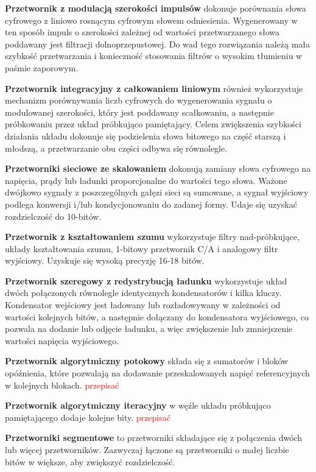 \documentclass[10pt,a4paper,twoside]{report}
\theoremstyle{definition}
\theoremstyle{definition}
\theoremstyle{definition}
\theoremstyle{definition}
\theoremstyle{definition}
\begin{document}
	{	\textbf{Przetwornik z modulacją szerokości impulsów} dokonuje porównania słowa cyfrowego z liniowo rosnącym cyfrowym słowem odniesienia. Wygenerowany w ten sposób impuls o szerokości zależnej od wartości przetwarzanego słowa poddawany jest filtracji dolnoprzepustowej. Do wad tego rozwiązania należą mała szybkość przetwarzania i konieczność stosowania filtrów o wysokim tłumieniu w paśmie zaporowym. }
	
	{	\textbf{Przetwornik integracyjny z całkowaniem liniowym} również wykorzystuje mechanizm porównywania liczb cyfrowych do wygenerowania sygnału o modulowanej szerokości, który jest poddawany scałkowaniu, a następnie próbkowaniu przez układ próbkująco pamiętający. Celem zwiększenia szybkości działania układu dokonuje się podzielenia słowa bitowego na część starszą i młodszą, a przetwarzanie obu części odbywa się równolegle. }
	
	{	\textbf{Przetworniki sieciowe ze skalowaniem} dokonują zamiany słowa cyfrowego na napięcia, prądy lub ładunki proporcjonalne do wartości tego słowa. Ważone dwójkowo sygnały z poszczególnych gałęzi sieci są sumowane, a sygnał wyjściowy podlega konwersji i/lub kondycjonowaniu do zadanej formy. Udaje się uzyskać rozdzielczość do 10-bitów.}
	
	{	\textbf{Przetwornik z kształtowaniem szumu} wykorzystuje filtry nad-próbkujące, układy kształtowania szumu, 1-bitowy przetwornik C/A i analogowy filtr wyjściowy. Uzyskuje się wysoką precyzję 16-18 bitów. }
	
	{	\textbf{Przetwornik szeregowy z redystrybucją ładunku} wykorzystuje układ dwóch połączonych równolegle identycznych kondensatorów i kilka kluczy. Kondensator wejściowy jest ładowany lub rozładowywany w zależności od wartości kolejnych bitów, a następnie dołączany do kondensatora wyjściowego, co pozwala na dodanie lub odjęcie ładunku, a więc zwiększenie lub zmniejszenie wartości napięcia wyjściowego.
	}
	
	{	\textbf{Przetwornik algorytmiczny potokowy} składa się z sumatorów i bloków opóźnienia, które pozwalają na dodawanie przeskalowanych napięć referencyjnych w kolejnych blokach. \textcolor{red}{przepisać} }

	{	\textbf{Przetwornik algorytmiczny iteracyjny} w węźle układu próbkująco pamiętającego dodaje kolejne bity. \textcolor{red}{przepisać} }

	{ 	\textbf{Przetworniki segmentowe} to przetworniki składające się z połączenia dwóch lub więcej przetworników. Zazwyczaj łączone są przetworniki o małej liczbie bitów w większe, aby zwiększyć rozdzielczość. }
\end{document}
